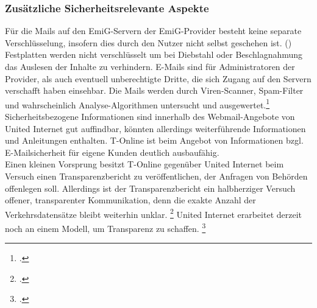 \documentclass  [paper=a4,
				fontsize=12pt,
				listof=totoc,
				bibliography=totoc
				]{scrreprt}
\begin{document}
		\subsubsection{Zusätzliche Sicherheitsrelevante Aspekte}
			Für die Mails auf den EmiG-Servern der EmiG-Provider besteht keine separate Verschlüsselung, insofern dies durch den Nutzer nicht selbst geschehen ist. ()
			Festplatten werden nicht verschlüsselt um bei Diebstahl oder Beschlagnahmung das Auslesen der Inhalte zu verhindern.
			E-Mails sind für Administratoren der Provider, als auch eventuell unberechtigte Dritte, die sich Zugang auf den Servern verschafft haben einsehbar. 
			Die Mails werden durch Viren-Scanner, Spam-Filter und wahrscheinlich Analyse-Algorithmen untersucht und ausgewertet.\footcite[Vgl.][]{Kurz13}
			Sicherheitsbezogene Informationen sind innerhalb des Webmail-Angebote von United Internet gut auffindbar, könnten allerdings weiterführende Informationen und Anleitungen enthalten.
			T-Online ist beim Angebot von Informationen bzgl. E-Mailsicherheit für eigene Kunden deutlich ausbaufähig.\\
			Einen kleinen Vorsprung besitzt T-Online gegenüber United Internet beim Versuch einen Transparenzbericht zu veröffentlichen, der Anfragen von Behörden offenlegen soll.
			Allerdings ist der Transparenzbericht ein halbherziger Versuch offener, transparenter Kommunikation, denn  die exakte Anzahl der Verkehrsdatensätze bleibt weiterhin unklar.
			\footcite[Vgl.][]{Beuth14}
			United Internet erarbeitet derzeit noch an einem Modell, um Transparenz zu schaffen.
			\footcite[Vgl.][]{Boehm14}
\end{document}

